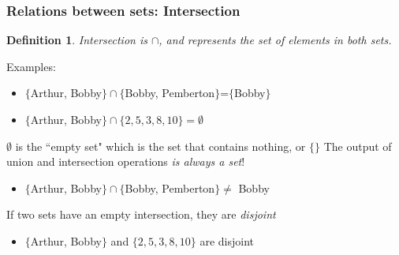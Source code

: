 \documentclass[aspectratio=169, handout]{beamer}
\newtheorem{defn}{Definition}
\numberwithin{equation}{section}
\begin{document}
\begin{frame}
\frametitle{Relations between sets: Intersection}

\begin{defn}
Intersection is $\cap$, and represents the set of elements in \textit{both} sets.
\end{defn}
\pause

{Examples: }
\begin{itemize}
\item $\{$Arthur, Bobby$\} \cap \{$Bobby, Pemberton$\}$=$\{$Bobby$\}$ \pause
\item $\{$Arthur, Bobby$\} \cap \{2, 5, 3, 8, 10\}=\emptyset$ \pause
\end{itemize}

$\emptyset$ is the ``empty set" which is the set that contains nothing, or $\{\}$ 
The output of union and intersection operations \textit{is always a set}! \pause

\begin{itemize}
\item $\{$Arthur, Bobby$\} \cap \{$Bobby, Pemberton$\} \not=$ Bobby \pause
\end{itemize}

If two sets have an empty intersection, they are \textit{disjoint} \pause

\begin{itemize}
\item $\{$Arthur, Bobby$\}$ and $  \{2, 5, 3, 8, 10\}$ are disjoint
\end{itemize}

\end{frame}
\end{document}
